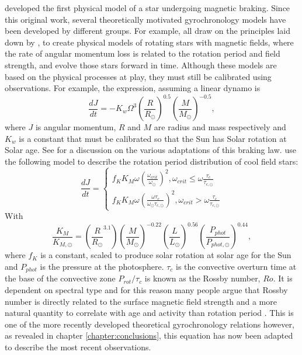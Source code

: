 \citet{Kawaler1988} developed the first physical model of a star undergoing
magnetic braking.
Since this original work, several theoretically motivated gyrochronology
models have been developed by different groups.
For example, \citet{Collier-cameron1994, Reiners2012, Vansaders2013,
Epstein2014} all draw on the principles laid down by \citet{Kawaler1988}, to
create physical models of rotating stars with magnetic fields, where the rate
of angular momentum loss is related to the rotation period and field strength,
and evolve those stars forward in time.
Although these models are based on the physical processes at play, they must
still be calibrated using observations.
For example, the \citet{Kawaler1988} expression, assuming a linear dynamo is
\begin{equation}
\frac{dJ}{dt} = -K_w\Omega^3\left(\frac{R}{R_\odot}\right)^{0.5}
\left(\frac{M}{M_\odot}\right)^{-0.5},
\end{equation}
where $J$ is angular momentum, $R$ and $M$ are radius and mass respectively
and $K_w$ is a constant that must be calibrated so that the Sun has Solar
rotation at Solar age.
See \citet{Barnes2010b} for a discussion on the various adaptations of this
braking law.
\citet{Vansaders2013} use the following model to describe the rotation period
distribution of cool field stars:
\begin{equation}
\frac{dJ}{dt} = \left\{
                \begin{array}{ll}
                  f_K K_M \omega \left( \frac{\omega_{crit}}{\omega_\odot}
                  \right)^2, \omega_{crit} \leq \omega
                  \frac{\tau_{c}}{\tau_{c, \odot}} \\
                  f_K K_M \omega \left( \frac{\omega\tau_{c}}
                  {\omega_\odot\tau_{c, \odot}}
                  \right)^2, \omega_{crit} > \omega
                  \frac{\tau_{c}}{\tau_{c, \odot}}
                \end{array}
              \right.
\end{equation}
\label{eq:vansaders}
With
\begin{equation}
    \frac{K_M}{K_{M, \odot}} = \left(\frac{R}{R_\odot}^{3.1}\right)
    \left(\frac{M}{M_\odot}\right)^{-0.22}
    \left(\frac{L}{L_\odot}\right)^{0.56}
    \left(\frac{P_{phot}}{P_{phot, \odot}}\right)^{0.44},
\end{equation}
\label{eq:vansaders2}
where $f_K$ is a constant, scaled to produce solar rotation at solar age for
the Sun and $P_{phot}$ is the pressure at the photosphere.
$\tau_c$ is the convective overturn time at the base of the convective zone
$P_{rot}/\tau_c$ is known as the Rossby number, $Ro$.
It is dependent on spectral type and for this reason many people argue that
Rossby number is directly related to the surface magnetic field strength and a
more natural quantity to correlate with age and activity than rotation period
\citep[\eg][]{Vansaders2016} \citep[although this view is not universally
held \citep[see, \eg][]{Reiners2014}.
This is one of the more recently developed theoretical gyrochronology
relations however, as revealed in chapter \ref{chapter:conclusions}, this
equation has now been adapted to describe the most recent observations.

